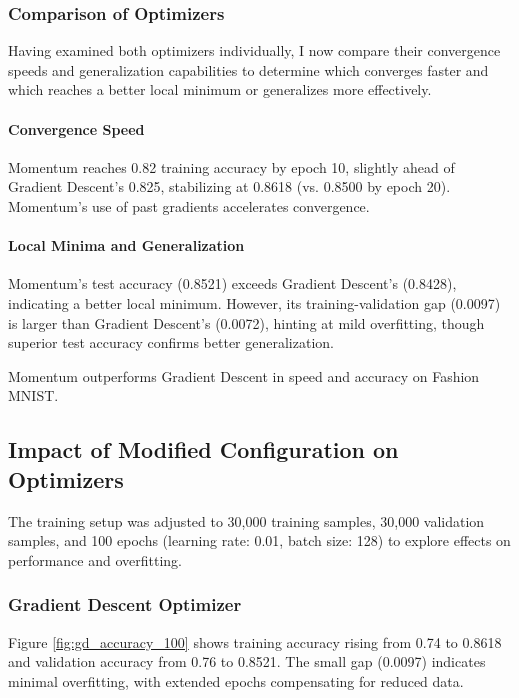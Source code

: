 \documentclass{article}
\begin{document}
\subsubsection{Comparison of Optimizers}

Having examined both optimizers individually, I now compare their convergence speeds and generalization capabilities to determine which converges faster and which reaches a better local minimum or generalizes more effectively.

\paragraph{Convergence Speed}  
  Momentum reaches 0.82 training accuracy by epoch 10, slightly ahead of Gradient Descent’s 0.825, stabilizing at 0.8618 (vs. 0.8500 by epoch 20). Momentum’s use of past gradients accelerates convergence.

\paragraph{Local Minima and Generalization}
  Momentum’s test accuracy (0.8521) exceeds Gradient Descent’s (0.8428), indicating a better local minimum. However, its training-validation gap (0.0097) is larger than Gradient Descent’s (0.0072), hinting at mild overfitting, though superior test accuracy confirms better generalization.
  
Momentum outperforms Gradient Descent in speed and accuracy on Fashion MNIST.

\subsection{Impact of Modified Configuration on Optimizers}

The training setup was adjusted to 30,000 training samples, 30,000 validation samples, and 100 epochs (learning rate: 0.01, batch size: 128) to explore effects on performance and overfitting.

\subsubsection{Gradient Descent Optimizer}

Figure \ref{fig:gd_accuracy_100} shows training accuracy rising from 0.74 to 0.8618 and validation accuracy from 0.76 to 0.8521. The small gap (0.0097) indicates minimal overfitting, with extended epochs compensating for reduced data.
\end{document}

